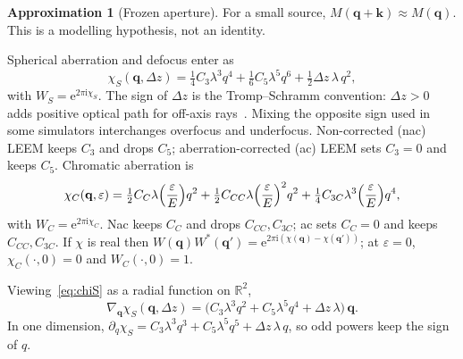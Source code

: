 \documentclass[11pt,a4paper]{article}
\theoremstyle{definition}
\newtheorem{approximation}[theorem]{Approximation}
\theoremstyle{remark}
\newcommand{\R}{\mathbb{R}}
\newcommand{\ee}{\mathrm{e}}
\newcommand{\ii}{\mathrm{i}}
\newcommand{\Dz}{\Delta z}
\begin{document}
\begin{approximation}[Frozen aperture]
\label{approx:aperture}
For a small source, $M(\mathbf{q}+\mathbf{k})\approx M(\mathbf{q})$.
This is a modelling hypothesis, not an identity.
\end{approximation}

Spherical aberration and defocus enter as
\begin{equation}
\label{eq:chiS}
\chi_S(\mathbf{q},\Dz)
=\tfrac14 C_3\lambda^3 q^4
+\tfrac16 C_5\lambda^5 q^6
+\tfrac12\Dz\,\lambda\,q^2,
\end{equation}
with $W_S=\ee^{2\pi\ii\chi_S}$.
The sign of $\Dz$ is the Tromp--Schramm convention: $\Dz>0$ adds
positive optical path for off-axis rays~\cite{Tromp2012}.
Mixing the opposite sign used in some simulators interchanges
overfocus and underfocus.
Non-corrected (nac) LEEM keeps $C_3$ and drops $C_5$;
aberration-corrected (ac) LEEM sets $C_3=0$ and keeps $C_5$.
Chromatic aberration is
\begin{equation}
\label{eq:chiC}
\chi_C(\mathbf{q},\varepsilon)
=\tfrac12 C_C\lambda\Bigl(\frac{\varepsilon}{E}\Bigr)q^2
+\tfrac12 C_{CC}\lambda\Bigl(\frac{\varepsilon}{E}\Bigr)^2 q^2
+\tfrac14 C_{3C}\lambda^3\Bigl(\frac{\varepsilon}{E}\Bigr)q^4,
\end{equation}
with $W_C=\ee^{2\pi\ii\chi_C}$.
Nac keeps $C_C$ and drops $C_{CC},C_{3C}$; ac sets $C_C=0$ and keeps
$C_{CC},C_{3C}$.
If $\chi$ is real then
$W(\mathbf{q})W^*(\mathbf{q}')=\ee^{2\pi\ii(\chi(\mathbf{q})-\chi(\mathbf{q}'))}$;
at $\varepsilon=0$, $\chi_C(\cdot,0)=0$ and $W_C(\cdot,0)=1$.

Viewing~\eqref{eq:chiS} as a radial function on $\R^2$,
\begin{equation}
\label{eq:grad}
\nabla_{\mathbf{q}}\chi_S(\mathbf{q},\Dz)
=\bigl(C_3\lambda^3 q^2+C_5\lambda^5 q^4+\Dz\,\lambda\bigr)\,\mathbf{q}.
\end{equation}
In one dimension,
$\partial_q\chi_S=C_3\lambda^3 q^3+C_5\lambda^5 q^5+\Dz\,\lambda\,q$,
so odd powers keep the sign of $q$.
\end{document}
